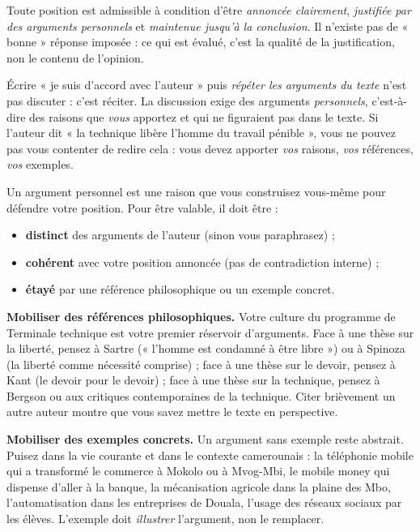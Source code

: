 \documentclass[11pt]{article}
\newcommand{\cle}[1]{{\popxbold\color{popdark}#1}}
\newcounter{popsec}
\newcounter{popsub}
\newcommand{\courssub}[1]{%
  \stepcounter{popsub}%
  \par\vspace{9pt}\noindent{\popxbold\fontsize{11.5}{13}\selectfont\color{popink}{\color{poporange}\thepopsec.\thepopsub}\hspace{6pt}#1}\par\nopagebreak\vspace{4pt}
}
\begin{document}
\begin{propriete}
Toute position est admissible à condition d'être \emph{annoncée clairement}, \emph{justifiée par des arguments personnels} et \emph{maintenue jusqu'à la conclusion}. Il n'existe pas de « bonne » réponse imposée : ce qui est évalué, c'est la qualité de la justification, non le contenu de l'opinion.
\end{propriete}

\begin{attention}
Écrire « je suis d'accord avec l'auteur » puis \emph{répéter les arguments du texte} n'est pas discuter : c'est réciter. La discussion exige des arguments \emph{personnels}, c'est-à-dire des raisons que \emph{vous} apportez et qui ne figuraient pas dans le texte. Si l'auteur dit « la technique libère l'homme du travail pénible », vous ne pouvez pas vous contenter de redire cela : vous devez apporter \emph{vos} raisons, \emph{vos} références, \emph{vos} exemples.
\end{attention}

\courssub{Construire des arguments personnels}

Un \cle{argument personnel} est une raison que vous construisez vous-même pour défendre votre position. Pour être valable, il doit être :
\begin{itemize}
\item \textbf{distinct} des arguments de l'auteur (sinon vous paraphrasez) ;
\item \textbf{cohérent} avec votre position annoncée (pas de contradiction interne) ;
\item \textbf{étayé} par une référence philosophique ou un exemple concret.
\end{itemize}

\textbf{Mobiliser des références philosophiques.} Votre culture du programme de Terminale technique est votre premier réservoir d'arguments. Face à une thèse sur la liberté, pensez à Sartre (« l'homme est condamné à être libre ») ou à Spinoza (la liberté comme nécessité comprise) ; face à une thèse sur le devoir, pensez à Kant (le devoir pour le devoir) ; face à une thèse sur la technique, pensez à Bergson ou aux critiques contemporaines de la technique. Citer brièvement un autre auteur montre que vous savez mettre le texte en perspective.

\textbf{Mobiliser des exemples concrets.} Un argument sans exemple reste abstrait. Puisez dans la vie courante et dans le contexte camerounais : la téléphonie mobile qui a transformé le commerce à Mokolo ou à Mvog-Mbi, le mobile money qui dispense d'aller à la banque, la mécanisation agricole dans la plaine des Mbo, l'automatisation dans les entreprises de Douala, l'usage des réseaux sociaux par les élèves. L'exemple doit \emph{illustrer} l'argument, non le remplacer.
\end{document}
